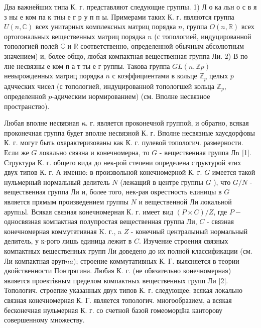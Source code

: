 \documentclass[10pt]{article}
\begin{document}
Два важнейших типа К. г. представляют следующие группы. 1) Л о ка льн о с в я з ны е ком па к тны е г р у п п ы. Примерами таких К. г. являются группа $U(n, \mathbb{C})$ всех унитарных комплексных матриц порядка $n$, группа $O(n, \mathbb{R})$ всех ортогональных вещественных матриц порядка $n$ (с топологией, индуцированной топологией полей $\mathbb{C}$ и $\mathbb{R}$ соответственно, определенной обычным абсолютным значением) и, более общо, любая компактная вещественная группа Ли. 2) В по лне несвязны е ком п а т ты е г руппы. Такова группа $G L(n, \mathbb{Z} p)$ невырожденных матриц порядка $n$ с коэффициентами в кольце $\mathbb{Z}_{p}$ целых $p$ адчческих чисел (с топологией, индуцированной топологшей кольца $\mathbb{Z}_{p}$, определенной $p$-адическим нормированием) (см. Вполне несвязное пространство).



Любая вполне несвязная $\boldsymbol{\kappa}$. г. является проконечной группой, и обратно, всякая проконечная группа будет вполне несвязной К. г. Вполне несвязные хаусдорфовы К. г. могут быть охарактеризованы как К. г. пулевой топологич. размерности. Если же $G$ локально связна и конечномерна, то $G$ - вещественная группа Лn [1]. Структура К. г. общего вида до нек-рой степени определена структурой этих двух типов К. г. А именно: в произвольной конечномерной К. г. $G$ имеется такой нульмерный нормальный делитель $N$ (лежащий в центре группы $G$ ), что $G / N$ - вещественная группа Ли и, более того, нек-рая окрестность единицы в $G$ является прямым произведением группы $N$ и вещественной Ли локальной арупnьl. Всякая связная конечномерная К. г. имеет вид $(P \times C) / Z$, где $P-$ односвязная компактная полупростая вещественная группа Ли, $C$ - связная конечномерная коммутативная $\mathrm{K}$. г., a $Z$ - конечный централыный нормальный делитель, у к-рого лишь единица лежит в $C$. Изучение строения связных компактных вещественных групп Ли доведено до их полной классификации (см. Ли компактная әруп$n a)$; строение коммутативных К. Г. выясняется в теории двойственности Понтрягина. Любая К. г. (не обязательно конечномерная) является проектівным пределом компактных вещественных групп Ли [2]. Топологич. строепие указанных двух типов К. г. следующее: всякая локально связная конечномерная К. Г. является топологич. многообразием, а всякая бесконечная нульмерная К. г. со счетной базой гомеоморџ̌на канторову совершенному множеству.
\end{document}

